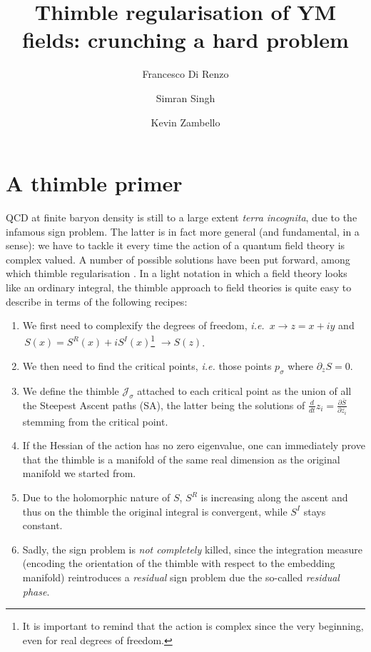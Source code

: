 \documentclass[a4paper,11pt]{article}
\title{Thimble regularisation of YM fields: crunching a hard problem}
\author*{Francesco Di Renzo}
\author{Simran Singh}
\author{Kevin Zambello}
\affiliation[]{Dipartimento di Scienze Matematiche, Fisiche e
  Informatiche, Università di Parma\\ 
and INFN, Gruppo Collegato di Parma, I-43100, Parma, Italy}
\begin{document}
\maketitle


\section{A thimble primer}
\label{sec:Basics}

QCD at finite baryon density is still to a large extent {\em terra
incognita}, due to the infamous sign problem. The latter is in fact
more general (and fundamental, in a sense): we have to tackle it every
time the action of a quantum field theory is complex valued. A number 
of possible solutions have been put forward, among which thimble 
regularisation \cite{Aurora,Kikukawa}. In a light notation in which 
a field theory looks like an ordinary integral, the thimble approach
to field theories is quite easy to describe in terms of the following
recipes:
\begin{enumerate}
\item We first need to complexify the degrees of freedom, {\em i.e.} $\,x
  \rightarrow z=x+iy$ and $\,S(x) = S^R(x) + iS^I(x)$\footnote{It is
    important to remind that the action is complex since the very
    beginning, even for real degrees of freedom.} $\rightarrow S(z)$.
\item We then need to find the critical points, {\em i.e.} those
  points $p_{\sigma}$ where $\partial_z S = 0$.
\item We define the thimble $\mathcal{J}_\sigma$ attached to each critical point as the union of all
  the Steepest Ascent paths (SA), the latter being the solutions of $\frac{d}{dt} z_i = \frac{\partial
  \bar{S}}{\partial \bar{z_i}}$ stemming from the critical point. 
\item If the Hessian of the action has no zero eigenvalue, one can
  immediately prove that the thimble
  is a manifold of the same real dimension as the original manifold we
  started from.
\item Due to the holomorphic nature of $S$, $S^R$ is increasing along
  the ascent and thus on the thimble the original
  integral is convergent, while $S^I$ stays constant.
\item Sadly, the sign problem is {\em not completely} killed,
since the integration measure (encoding the orientation of the
thimble with respect to the embedding manifold) reintroduces a 
{\em residual} sign problem due the so-called {\em residual phase}.
\end{enumerate}
\end{document}
